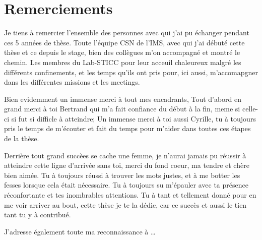 \documentclass[../main.tex]{subfiles}
\begin{document}
\chapter*{Remerciements}


Je tiens à remercier l'ensemble des personnes avec qui j'ai pu échanger pendant ces 5 années de thèse. 
Toute l'équipe CSN de l'IMS, avec qui j'ai débuté cette thèse et ce depuis le stage, bien des collègues m'on accompagné et montré le chemin. 
Les membres du Lab-STICC pour leur acceuil chaleureux malgré les différents confinements, et les temps qu'ils ont pris pour, ici aussi, m'accomapgner dans les différentes missions et 
les meetings. 

Bien evidemment un immense merci à tout mes encadrants,
Tout d'abord en grand merci à toi Bertrand qui m'a fait confiance du début à la fin, meme si celle-ci si fut si difficle à atteindre; 
Un immense merci à toi aussi Cyrille, tu à toujours pris le temps de m'écouter et fait du temps pour m'aider dans toutes ces étapes de la thèse. 




Derrière tout grand succèes se cache une femme, je n'aurai jamais pu réussir à atteindre cette ligne d'arrivée sans toi, merci du fond coeur, ma tendre et chère bien aimée.
Tu à toujours réussi à trouver les mots justes, et à me botter les fesses lorsque cela était nécessaire. Tu à toujours su m'épauler avec ta présence réconfortante et tes inombrables attentions.
Tu à tant et tellement donné pour en me voir arriver au bout, cette thèse je te la dédie, car ce succès et aussi le tien tant tu y à contribué.


J'adresse également toute ma reconnaissance à \dots
\end{document}
